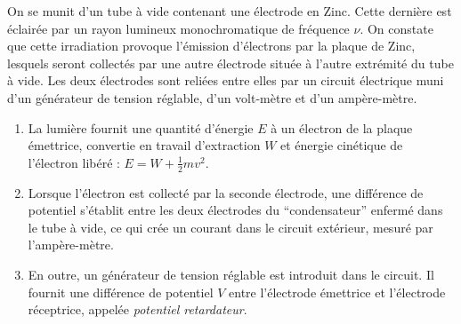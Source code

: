 On se munit d'un tube à vide contenant une électrode en Zinc. Cette dernière est éclairée par un rayon lumineux monochromatique de fréquence $\nu$. On constate que cette irradiation provoque l'émission d'électrons par la plaque de Zinc, lesquels seront collectés par une autre électrode située à l'autre extrémité du tube à vide. Les deux électrodes sont reliées entre elles par un circuit électrique muni d'un générateur de tension réglable, d'un volt-mètre et d'un ampère-mètre. 
\begin{enumerate}
\item La lumière fournit une quantité d'énergie $E$ à un électron de la plaque émettrice, convertie en travail d'extraction $W$ et énergie cinétique de l'électron libéré : $E = W + \frac{1}{2}mv^2$.
\item Lorsque l'électron est collecté par la seconde électrode, une différence de potentiel s'établit entre les deux électrodes du ``condensateur'' enfermé dans le tube à vide, ce qui crée un courant dans le circuit extérieur, mesuré par l'ampère-mètre. 
\item En outre, un générateur de tension réglable est introduit dans le circuit. Il fournit une différence de potentiel $V$ entre l'électrode émettrice et l'électrode réceptrice, appelée \textit{potentiel retardateur}.
\end{enumerate} 
$ $\\

